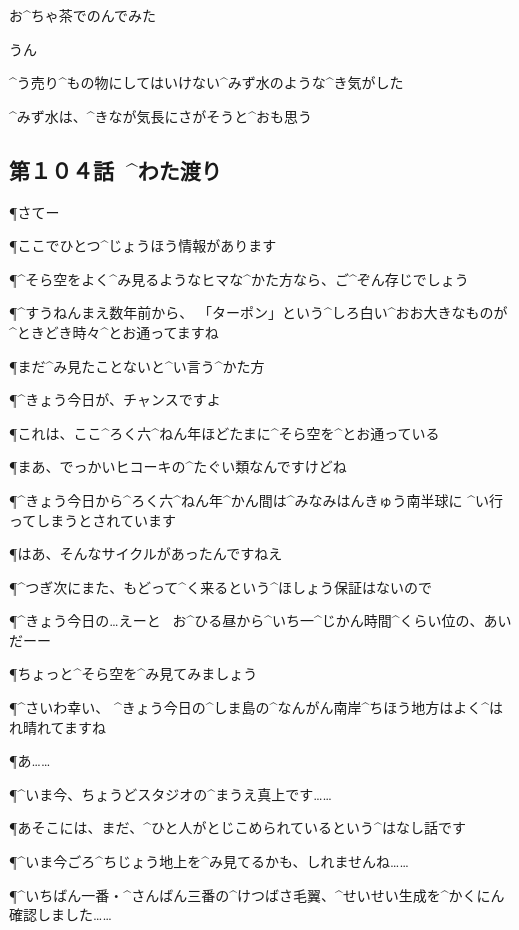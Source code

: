 \page[55]
\A お^{ちゃ}{茶}でのんでみた

\A うん

\page
\A ^{う}{売}り^{もの}{物}にしてはいけない^{みず}{水}のような^{き}{気}がした

\A ^{みず}{水}は、^{きなが}{気長}にさがそうと^{おも}{思}う


\subsection{第１０４話\ ^{わた}{渡}り}

\page[59]
\P さてー

\P ここでひとつ^{じょうほう}{情報}があります

\page
\P ^{そら}{空}をよく^{み}{見}るようなヒマな^{かた}{方}なら、ご^{ぞん}{存}じでしょう

\P ^{すうねんまえ}{数年前}から、
「ターポン」という^{しろ}{白}い^{おお}{大}きなものが^{ときどき}{時々}^{とお}{通}ってますね

\P まだ^{み}{見}たことないと^{い}{言}う^{かた}{方}

\P ^{きょう}{今日}が、チャンスですよ

\P これは、ここ^{ろく}{六}^{ねん}{年}ほどたまに^{そら}{空}を^{とお}{通}っている

\P まあ、でっかいヒコーキの^{たぐい}{類}なんですけどね

\page
\P ^{きょう}{今日}から^{ろく}{六}^{ねん}{年}^{かん}{間}は^{みなみはんきゅう}{南半球}に
^{い}{行}ってしまうとされています

\P はあ、そんなサイクルがあったんですねえ

\P ^{つぎ}{次}にまた、もどって^{く}{来}るという^{ほしょう}{保証}はないので

\P ^{きょう}{今日}の…えーと
\ お^{ひる}{昼}から^{いち}{一}^{じかん}{時間}^{くらい}{位}の、あいだーー

\P ちょっと^{そら}{空}を^{み}{見}てみましょう

\P ^{さいわ}{幸}い、
^{きょう}{今日}の^{しま}{島}の^{なんがん}{南岸}^{ちほう}{地方}はよく^{はれ}{晴れ}てますね

\page[63]
\P あ……

\P ^{いま}{今}、ちょうどスタジオの^{まうえ}{真上}です……

\page[65]
\P あそこには、まだ、^{ひと}{人}がとじこめられているという^{はなし}{話}です

\P ^{いま}{今}ごろ^{ちじょう}{地上}を^{み}{見}てるかも、しれませんね……

\page[69]
\P ^{いちばん}{一番}・^{さんばん}{三番}の^{けつばさ}{毛翼}、^{せいせい}{生成}を^{かくにん}{確認}しました……

